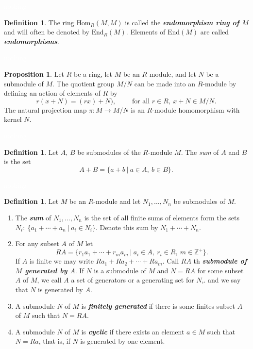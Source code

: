 \documentclass{article}
\theoremstyle{definition}
\newtheorem{prop}[thm]{Proposition}
\newtheorem{defn}[thm]{Definition}
\newcommand{\nl}{\textcolor{white}{nothing}}
\newcommand{\ra}{\rightarrow}
\newcommand{\Z}{\mathbb{Z}}
\newcommand{\Hom}{\text{Hom}}
\newcommand{\End}{\text{End}}
\begin{document}
\nl

\begin{defn}
The ring $\Hom_R(M,M)$ is called the \textbf{\textit{endomorphism ring of $M$}} and will often be denoted by $\End_R(M)$. Elements of $\End(M)$ are called \textbf{\textit{endomorphisms}}.
\end{defn}

\nl

\begin{prop}
Let $R$ be a ring, let $M$ be an $R$-module, and let $N$ be a submodule of $M$. The quotient group $M/N$ can be made into an $R$-module by defining an action of elements of $R$ by
\[r(x + N) = (rx) + N),\qquad\text{ for all }r\in R,\ x + N \in M/N.\]
The natural projection map $\pi:M\ra M/N$ is an $R$-module homomorphism with kernel $N$.
\end{prop}

\nl

\begin{defn}
Let $A$, $B$ be submodules of the $R$-module $M$. The \textit{sum} of $A$ and $B$ is the set 
\[A + B = \{a + b\ |\ a\in A,\ b\in B\}.\]
\end{defn}

\nl

\begin{defn}
Let $M$ be an $R$-module and let $N_1,\ldots,N_n$ be submodules of $M$.
\begin{enumerate}
\item The \textbf{\textit{sum}} of $N_1,\ldots,N_n$ is the set of all finite sums of elements form the sets $N_i:\ \{a_1+\cdots+a_n\ |\ a_i\in N_i\}$. Denote this sum by $N_1+\cdots +N_n$.
\item For any subset $A$ of $M$ let
\[RA = \{r_1a_1+\cdots+r_ma_m\ |\ a_i\in A,\ r_i \in R,\ m\in\Z^+\}.\]
If $A$ is finite we may write $Ra_1 + Ra_2+\cdots +Ra_m$. Call $RA$ th \textit{\textbf{submodule of $M$ generated by $A$}}. If $N$ is a submodule of $M$ and $N = RA$ for some subset $A$ of $M$, we call $A$ a set of generators or a generating set for $N$,. and we say that $N$ is generated by $A$.
\item A submodule $N$ of $M$ is \textbf{\textit{finitely generated}} if there is some finites subset $A$ of $M$ such that $N = RA$.
\item A submodule $N$ of $M$ is \textit{\textbf{cyclic}} if there exists an element $a\in M$ such that $N = Ra$, that is, if $N$ is generated by one element.
\end{enumerate}
\end{defn}
\end{document}

